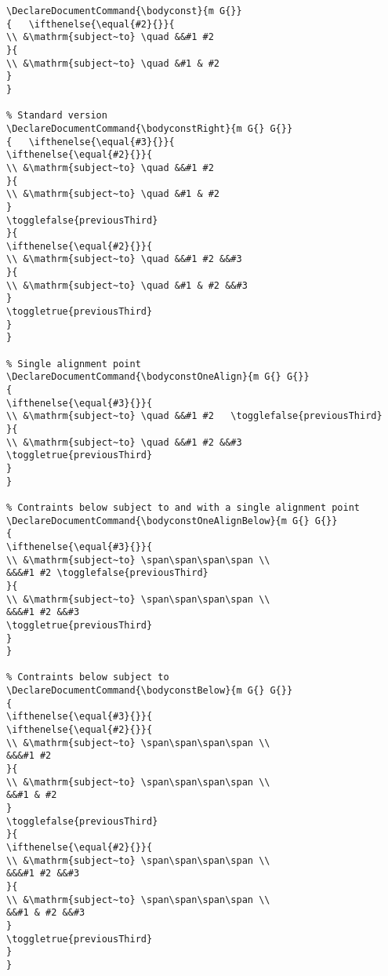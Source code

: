 \documentclass[]{report}
\begin{document}
\begin{lstlisting}
\DeclareDocumentCommand{\bodyconst}{m G{}}
{	\ifthenelse{\equal{#2}{}}{
\\ &\mathrm{subject~to} \quad &&#1 #2 
}{
\\ &\mathrm{subject~to} \quad &#1 & #2
}
}

% Standard version
\DeclareDocumentCommand{\bodyconstRight}{m G{} G{}}
{	\ifthenelse{\equal{#3}{}}{
\ifthenelse{\equal{#2}{}}{
\\ &\mathrm{subject~to} \quad &&#1 #2 	
}{
\\ &\mathrm{subject~to} \quad &#1 & #2 
}
\togglefalse{previousThird}
}{
\ifthenelse{\equal{#2}{}}{
\\ &\mathrm{subject~to} \quad &&#1 #2 &&#3
}{
\\ &\mathrm{subject~to} \quad &#1 & #2 &&#3
}
\toggletrue{previousThird}
}
}

% Single alignment point
\DeclareDocumentCommand{\bodyconstOneAlign}{m G{} G{}}
{
\ifthenelse{\equal{#3}{}}{
\\ &\mathrm{subject~to} \quad &&#1 #2 	\togglefalse{previousThird}
}{
\\ &\mathrm{subject~to} \quad &&#1 #2 &&#3
\toggletrue{previousThird}
}
}

% Contraints below subject to and with a single alignment point
\DeclareDocumentCommand{\bodyconstOneAlignBelow}{m G{} G{}}
{
\ifthenelse{\equal{#3}{}}{
\\ &\mathrm{subject~to} \span\span\span\span \\
&&&#1 #2 \togglefalse{previousThird}
}{
\\ &\mathrm{subject~to} \span\span\span\span \\
&&&#1 #2 &&#3	
\toggletrue{previousThird}
}	
}

% Contraints below subject to
\DeclareDocumentCommand{\bodyconstBelow}{m G{} G{}}
{
\ifthenelse{\equal{#3}{}}{
\ifthenelse{\equal{#2}{}}{
\\ &\mathrm{subject~to} \span\span\span\span \\
&&&#1 #2 
}{
\\ &\mathrm{subject~to} \span\span\span\span \\
&&#1 & #2 
}
\togglefalse{previousThird}
}{
\ifthenelse{\equal{#2}{}}{
\\ &\mathrm{subject~to} \span\span\span\span \\
&&&#1 #2 &&#3
}{
\\ &\mathrm{subject~to} \span\span\span\span \\
&&#1 & #2 &&#3
}
\toggletrue{previousThird}	
}
}


\end{lstlisting}
\end{document}
